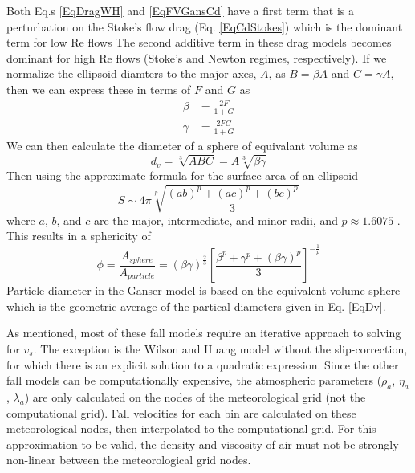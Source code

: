 Both Eq.s \ref{EqDragWH} and \ref{EqFVGansCd} have a first term that is a
perturbation on the Stoke's flow drag (Eq. \ref{EqCdStokes}) which is the
dominant term for low $\mathrm{Re}$ flows 
The second additive term in these drag models becomes
dominant for high $\mathrm{Re}$ flows (Stoke's and Newton regimes,
respectively).  If we normalize the ellipsoid diamters to the major axes,
$A$, as $B=\beta A$ and $C=\gamma A$, then we can
express these in terms of $F$ and $G$ as
\begin{eqnarray}\label{EqShapeBetaGamma}
\beta &= \frac{2F}{1+G} \\
\gamma&= \frac{2FG}{1+G}
\end{eqnarray}
We can then calculate the diameter of
a sphere of equivalant volume as
\begin{equation}\label{EqDv}
d_v = \sqrt[3]{ABC} = A \sqrt[3]{\beta \gamma}
\end{equation}
Then using the approximate formula for the surface area of an ellipsoid
\begin{equation}\label{EqAreaEllipsoid}
S \sim 4 \pi \sqrt[p]{\frac{(ab)^p + (ac)^p + (bc)^p}{3}}
\end{equation}
where $a$, $b$, and $c$ are the major, intermediate, and minor radii, and 
$p \approx 1.6075$ \cite{WikiEllipse}.  This results in a sphericity of
\begin{equation}\label{EqSpericity}
\phi = \frac{A_{sphere}}{A_{particle}} =\left( \beta \gamma \right)^{\frac{2}{3}}
\left[ \frac{\beta^p + \gamma^p + \left( \beta \gamma \right)^p}{3} \right]^{-\frac{1}{p}}
\end{equation}
Particle diameter in the Ganser model is based on the equivalent volume sphere which
is the geometric average of the partical diameters given in Eq. \ref{EqDv}.

As mentioned, most of these fall models require an iterative approach to solving
for $v_s$.  The exception is the Wilson and Huang model without the slip-correction,
for which there is an explicit solution to a quadratic expression.  Since the
other fall models can be computationally expensive, the atmospheric parameters
($\rho_a$, $\eta_a$, $\lambda_a$) are only calculated on the nodes of the
meteorological grid (not the computational grid).  Fall velocities for each
bin are calculated on these meteorological nodes,
then interpolated to the computational grid.
For this approximation to be valid, the density and viscosity of air must not
be strongly non-linear between the meteorological grid nodes.

